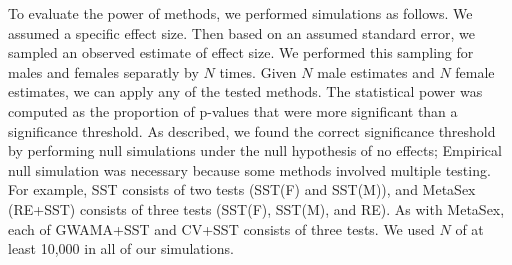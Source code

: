\documentclass[11pt]{article}
\begin{document}
To evaluate the power of methods, we performed simulations as follows.
We assumed a specific effect size. %
Then based on an assumed standard error, we sampled an observed estimate of effect size.
We performed this sampling for males and females separatly by $N$ times.
Given $N$ male estimates and $N$ female estimates,
we can apply any of the tested methods.
The statistical power was computed as the proportion of p-values that were
more significant than a significance threshold. %
As described, we found the correct significance threshold by performing null simulations under the null hypothesis of no effects;
Empirical null simulation was necessary because some methods involved multiple testing.
For example, SST consists of two tests (SST(F) and SST(M)), and MetaSex (RE+SST) consists of three tests (SST(F), SST(M), and RE).
As with MetaSex, each of GWAMA+SST and CV+SST consists of three tests.
We used $N$ of at least 10,000 in all of our simulations.


\end{document}
